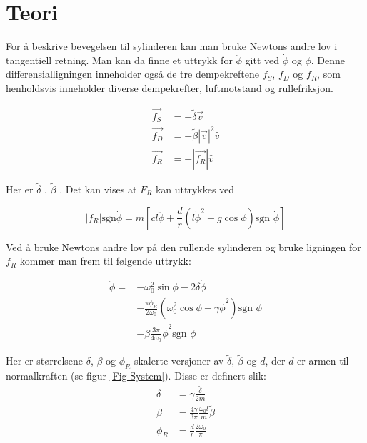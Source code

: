 \section{Teori}
For å beskrive bevegelsen til sylinderen kan man bruke Newtons andre lov i tangentiell retning.
Man kan da finne et uttrykk for \(\ddot{\phi}\) gitt ved \(\dot{\phi}\) og \(\phi\). 
Denne differensialligningen inneholder også de tre dempekreftene \(f_S\), \(f_D\) og \(f_R\), 
som henholdsvis inneholder diverse dempekrefter, luftmotstand og rullefriksjon.

\begin{align}
	\vec{f_S} & = -\tilde{\delta} \vec{v} 			\\
	\vec{f_D} & = -\tilde{\beta}|\vec{v}|^2\hat{v}  \\
	\vec{f_R} & = -|\vec{f_R}|\hat{v}				
\end{align}

Her er \(\tilde{\delta}\) , \(\tilde{\beta}\) .
Det kan vises at \(F_R\) kan uttrykkes ved

\begin{equation}
	|f_R|\text{sgn}\dot{\phi} =
	m\left[
		cl\ddot{\phi}+\frac{d}{r}
		\left(l\dot{\phi}^2 + g\cos\phi\right)
		\text{sgn }\dot{\phi}
	\right]
\end{equation}

Ved å bruke Newtons andre lov på den rullende sylinderen 
og bruke ligningen for \(f_R\) kommer man frem til følgende uttrykk:

\begin{equation}
	\begin{split}
		\label{ODE}	
		\ddot{\phi} = 	
		&- \omega_0^2\sin\phi - 2\delta\dot{\phi}	\\
		&- \frac{\pi\phi_R}{2\omega_0}
		\left(\omega_0^2\cos\phi + \gamma\dot{\phi}^2\right) \text{sgn } \dot{\phi} \\
		&- \beta \frac{3\pi}{4\omega_0}\dot{\phi}^2\text{sgn }\dot{\phi} 
	\end{split}
\end{equation}

Her er størrelsene \(\delta\), \(\beta\) og \(\phi_R\) skalerte versjoner av 
\(\tilde{\delta}\), \(\tilde{\beta}\) og \(d\), der \(d\) er armen til normalkraften (se figur \ref{Fig System}).
Disse er definert slik:
\begin{subequations}
    \begin{align}
        \delta & = \gamma\frac{\tilde{\delta}}{2m} \\
        \beta & = \frac{4\gamma}{3\pi}\frac{\omega_0l}{m}\tilde{\beta} \\
        \phi_R & = \frac{d}{r}\frac{2\omega_0}{\pi}
    \end{align}
\end{subequations}

